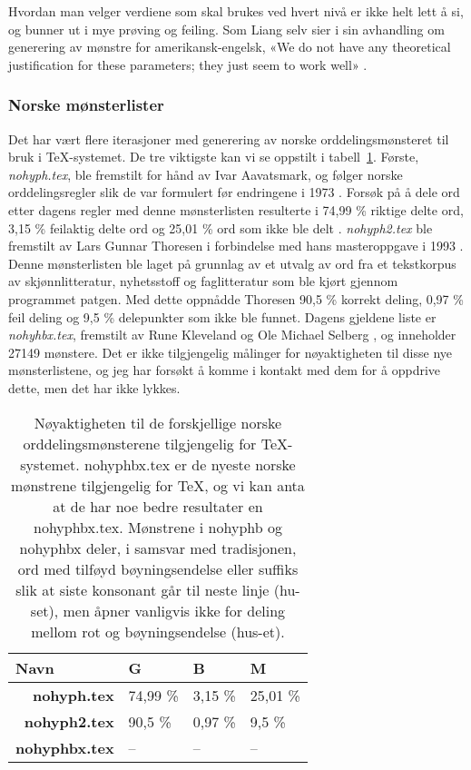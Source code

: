 Hvordan man velger verdiene som skal brukes ved hvert nivå er ikke helt lett å si, og bunner ut i mye prøving og feiling. Som Liang selv sier i sin avhandling om generering av mønstre for amerikansk-engelsk, «We do not have any theoretical justification for these parameters; they just seem to work well» \cite{liang1983word}. 

\subsubsection{Norske mønsterlister}

Det har vært flere iterasjoner med generering av norske orddelingsmønsteret til bruk i \TeX{}-systemet. De tre viktigste kan vi se oppstilt i tabell~\ref{tab:patterns}. Første, \textit{nohyph.tex}, ble fremstilt for hånd av Ivar Aavatsmark, og følger norske orddelingsregler slik de var formulert før endringene i 1973 \cite{nohyphbx, thoresen1993virtuelle}. Forsøk på å dele ord etter dagens regler med denne mønsterlisten resulterte i  74,99 \% riktige delte ord, 3,15 \% feilaktig delte ord og 25,01 \% ord som ikke ble delt \cite{thoresen1993virtuelle}. \textit{nohyph2.tex} ble fremstilt av Lars Gunnar Thoresen i forbindelse med hans masteroppgave i 1993 \cite{thoresen1993virtuelle}. Denne mønsterlisten ble laget på grunnlag av et utvalg av ord fra et tekstkorpus av skjønnlitteratur, nyhetsstoff og faglitteratur som ble kjørt gjennom programmet patgen. Med dette oppnådde Thoresen 90,5 \% korrekt deling, 0,97 \% feil deling og 9,5 \% delepunkter som ikke ble funnet. Dagens gjeldene liste er \textit{nohyhbx.tex}, fremstilt av Rune Kleveland og Ole Michael Selberg \cite{nohyphbx}, og inneholder 27149 mønstere. Det er ikke tilgjengelig målinger for nøyaktigheten til disse nye mønsterlistene, og jeg har forsøkt å komme i kontakt med dem for å oppdrive dette, men det har ikke lykkes. 

\begin{table}
\centering
\begin{tabular}{rlll}
\hline
\multicolumn{1}{l}{\textbf{Navn}} & \textbf{G} & \textbf{B} & \textbf{M} \\ \hline
\textbf{nohyph.tex}                 & 74,99 \%   & 3,15 \%    & 25,01 \%   \\ \hline
\textbf{nohyph2.tex}                & 90,5 \%    & 0,97 \%    & 9,5 \%     \\ \hline
\textbf{nohyphbx.tex}               & --         & --         & --         \\ \hline
\end{tabular}
\caption[Oversikt over orddelingsmønstere for \TeX{}]{Nøyaktigheten til de forskjellige norske orddelingsmønsterene tilgjengelig for \TeX{}-systemet. nohyphbx.tex er de nyeste norske mønstrene tilgjengelig for \TeX{}, og vi kan anta at de har noe bedre resultater en nohyphbx.tex. Mønstrene i nohyphb og nohyphbx deler, i samsvar med tradisjonen, ord med tilføyd bøyningsendelse eller suffiks slik at siste konsonant går til neste linje (hu-set), men åpner vanligvis ikke for deling mellom rot og bøyningsendelse (hus-et). \cite{nohyphbx}}
\label{tab:patterns}
\end{table}

